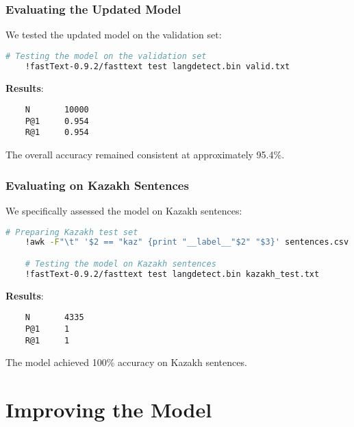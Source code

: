 \documentclass{beamer}
\begin{document}
\begin{frame}[fragile]
    \frametitle{Evaluating the Updated Model}
    We tested the updated model on the validation set:
    \begin{lstlisting}[language=bash]
    # Testing the model on the validation set
    !fastText-0.9.2/fasttext test langdetect.bin valid.txt
    \end{lstlisting}
    \textbf{Results}:
    \begin{lstlisting}
    N       10000
    P@1     0.954
    R@1     0.954
    \end{lstlisting}
    The overall accuracy remained consistent at approximately 95.4\%.
\end{frame}

\begin{frame}[fragile]
    \frametitle{Evaluating on Kazakh Sentences}
    We specifically assessed the model on Kazakh sentences:
    \begin{lstlisting}[language=bash]
    # Preparing Kazakh test set
    !awk -F"\t" '$2 == "kaz" {print "__label__"$2" "$3}' sentences.csv | shuf > kazakh_test.txt

    # Testing the model on Kazakh sentences
    !fastText-0.9.2/fasttext test langdetect.bin kazakh_test.txt
    \end{lstlisting}
    \textbf{Results}:
    \begin{lstlisting}
    N       4335
    P@1     1
    R@1     1
    \end{lstlisting}
    The model achieved 100\% accuracy on Kazakh sentences.
\end{frame}

\section{Improving the Model}
\end{document}
